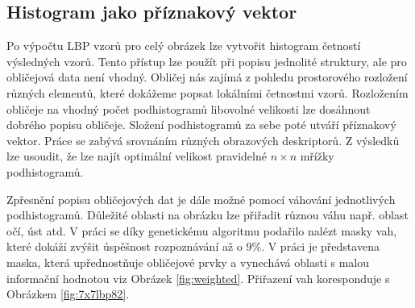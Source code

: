 \documentclass[czech,BP]{thesiskiv}
\begin{document}
\subsection{Histogram jako příznakový vektor} \label{section_histograms}
Po výpočtu LBP vzorů pro celý obrázek lze vytvořit histogram četností výsledných vzorů. Tento přístup lze použít při popisu jednolité struktury, ale pro obličejová data není vhodný. Obličej nás zajímá z pohledu prostorového rozložení různých elementů, které dokážeme popsat lokálními četnostmi vzorů. Rozložením obličeje na vhodný počet podhistogramů libovolné velikosti lze dosáhnout dobrého popisu obličeje. Složení podhistogramů za sebe poté utváří příznakový vektor. Práce \citet{Vojta2015} se zabývá srovnáním různých obrazových deskriptorů. Z výsledků lze usoudit, že lze najít optimální velikost pravidelné $n\times n$ mřížky podhistogramů.

Zpřesnění popisu obličejových dat je dále možné pomocí váhování jednotlivých podhistogramů. Důležité oblasti na obrázku lze přiřadit různou váhu např. oblast očí, úst atd. V práci \cite{Vojta2015} se díky genetickému algoritmu podařilo nalézt masky vah, které dokáží zvýšit úspěšnost rozpoznávání až o $9\%$. V práci \cite{Lopez2010} je představena maska, která upřednostňuje obličejové prvky a vynechává oblasti s malou informační hodnotou viz Obrázek \ref{fig:weighted}. Přiřazení vah koresponduje s Obrázkem \ref{fig:7x7lbp82}.
 
\end{document}
